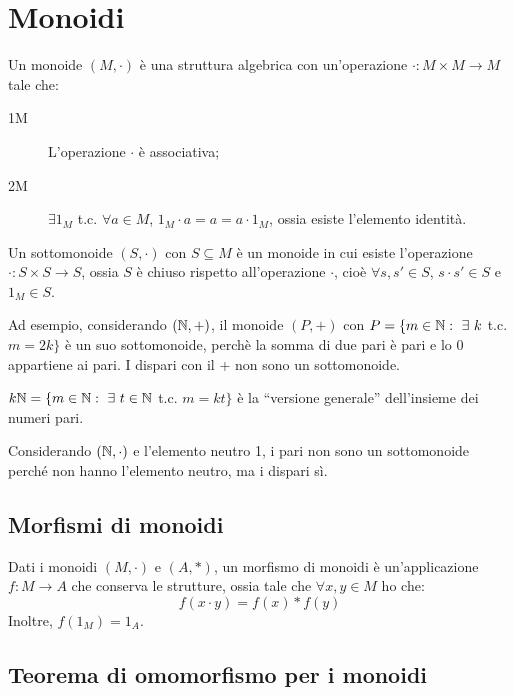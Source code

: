 \section{Monoidi}

Un monoide $(M, \cdot)$ \`e una struttura algebrica con un'operazione $\cdot : M \times M \to M$ tale che:
\begin{description}
    \item[1M] L'operazione $\cdot$ \`e associativa;
    \item[2M] $\exists 1_M $ t.c. $ \forall a \in M$, $ 1_M \cdot a = a = a \cdot 1_M$, ossia esiste l'elemento identit\`a. 
\end{description}

Un sottomonoide $(S, \cdot)$ con $S \subseteq M$ \`e un monoide in cui esiste l'operazione $\cdot : S \times S \to S$, ossia $S$ \`e chiuso rispetto all'operazione $\cdot$, cio\`e $\forall s, s' \in S $, $s \cdot s' \in S$ e $1_M \in S$.

Ad esempio, considerando $(\mathbb{N}, +)$, il monoide $(P, +)$ con $P = \{ m \in \naturals : \exists k $ t.c. $m = 2k \}$ \`e un suo sottomonoide, perch\`e la somma di due pari \`e pari e lo 0 appartiene ai pari. I dispari con il + non sono un sottomonoide.

$k \naturals = \{ m \in \naturals : \exists t \in \naturals $ t.c. $ m = k t\}$ \`e la ``versione generale'' dell'insieme dei numeri pari.

Considerando $(\mathbb{N}, \cdot)$ e l'elemento neutro 1, i pari non sono un sottomonoide perch\'e non hanno l'elemento neutro, ma i dispari s\`i.

\subsection{Morfismi di monoidi}

\begin{defn}
Dati i monoidi $(M, \cdot)$ e $(A, \ast)$, un morfismo di monoidi \`e un'applicazione $f : M \to A$ che conserva le strutture, ossia tale che $\forall x,y \in M $ ho che:
\[
f(x \cdot y) = f(x) \ast f(y)
\]
Inoltre, $f(1_M) = 1_A$.
\end{defn}

\subsection{Teorema di omomorfismo per i monoidi\label{omomorfismo_monoidi}}

